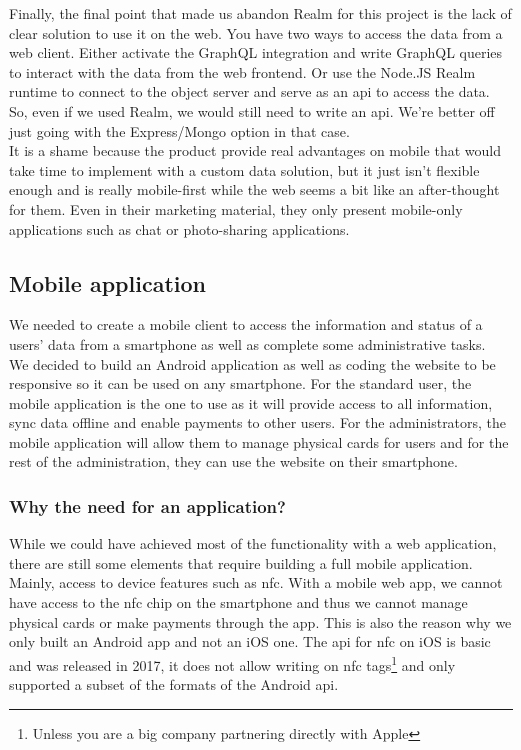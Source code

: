 \documentclass[twoside, openright,11pt,a4paper]{book}
\begin{document}
Finally, the final point that made us abandon Realm for this project is the lack of clear solution to use it on the web. You have two ways to access the data from a web client. Either activate the GraphQL integration and write GraphQL queries to interact with the data from the web frontend. Or use the Node.JS Realm runtime to connect to the object server and serve as an \gls{api} to access the data. So, even if we used Realm, we would still need to write an \gls{api}. We're better off just going with the Express/Mongo option in that case. \\

It is a shame because the product provide real advantages on mobile that would take time to implement with a custom data solution, but it just isn't flexible enough and is really mobile-first while the web seems a bit like an after-thought for them. Even in their marketing material, they only present mobile-only applications such as chat or photo-sharing applications.

\subsection{Mobile application}
We needed to create a mobile client to access the information and status of a users' data from a smartphone as well as complete some administrative tasks. \\

We decided to build an Android application as well as coding the website to be responsive so it can be used on any smartphone. For the standard user, the mobile application is the one to use as it will provide access to all information, sync data offline and enable payments to other users. For the administrators, the mobile application will allow them to manage physical cards for users and for the rest of the administration, they can use the website on their smartphone.
\subsubsection{Why the need for an application?}
While we could have achieved most of the functionality with a web application, there are still some elements that require building a full mobile application. Mainly, access to device features such as \gls{nfc}. With a mobile web app, we cannot have access to the \gls{nfc} chip on the smartphone and thus we cannot manage physical cards or make payments through the app. This is also the reason why we only built an Android app and not an iOS one. The \gls{api} for \gls{nfc} on iOS\cite{apple:ios:nfc} is basic and was released in 2017, it does not allow writing on \gls{nfc} tags\footnote{Unless you are a big company partnering directly with Apple} and only supported a subset of the formats of the Android \gls{api}.\\
\end{document}
